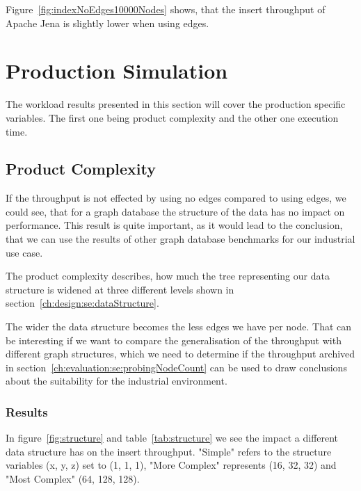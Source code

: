 Figure~\ref{fig:indexNoEdges10000Nodes} shows,
that the insert throughput of Apache Jena is slightly lower when using edges.

\section{Production Simulation}
\label{ch:evaluation:se:productionSimulation}
The workload results presented in this section will cover the production specific variables.
The first one being product complexity and the other one execution time.

\subsection{Product Complexity}
\label{ch:evaluation:se:productComplexity}
If the throughput is not effected by using no edges compared to using edges,
we could see,
that for a graph database the structure of the data has no impact on performance.
This result is quite important,
as it would lead to the conclusion,
that we can use the results of other graph database benchmarks for our industrial use case.

The product complexity describes,
how much the tree representing our data structure is widened at three different levels shown in section~\ref{ch:design:se:dataStructure}.

The wider the data structure becomes the less edges we have per node.
That can be interesting if we want to compare the generalisation of the throughput with different graph structures,
which we need to determine if the throughput archived in section~\ref{ch:evaluation:se:probingNodeCount} can be used to draw conclusions about the suitability for the industrial environment.

\subsubsection{Results}
In figure~\ref{fig:structure} and table~\ref{tab:structure} we see the impact a different data structure has on the insert throughput.
"Simple" refers to the structure variables (x, y, z) set to (1, 1, 1),
"More Complex" represents (16, 32, 32) and "Most Complex" (64, 128, 128).

